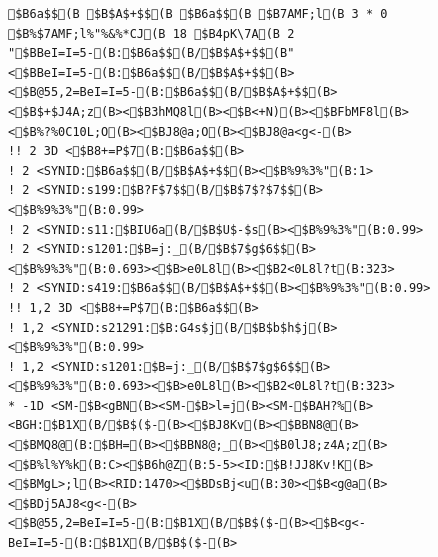 \documentclass[a4j]{jarticle}
\begin{document}
{{{{{{{{{\begin{figure}[t]
\begin{center}
\begin{minipage}{\hsize}
\begin{verbatim}
$B6a$$(B $B$A$+$$(B $B6a$$(B $B7AMF;l(B 3 * 0 $B%$7AMF;l%"%&%*CJ(B 18 $B4pK\7A(B 2 "$BBeI=I=5-(B:$B6a$$(B/$B$A$+$$(B" <$BBeI=I=5-(B:$B6a$$(B/$B$A$+$$(B><$B@55,2=BeI=I=5-(B:$B6a$$(B/$B$A$+$$(B><$B$+$J4A;z(B><$B3hMQ8l(B><$B<+N)(B><$BFbMF8l(B><$B%?%0C10L;O(B><$BJ8@a;O(B><$BJ8@a<g<-(B>
!! 2 3D <$B8+=P$7(B:$B6a$$(B>
! 2 <SYNID:$B6a$$(B/$B$A$+$$(B><$B%9%3%"(B:1>
! 2 <SYNID:s199:$B?F$7$$(B/$B$7$?$7$$(B><$B%9%3%"(B:0.99>
! 2 <SYNID:s11:$BIU6a(B/$B$U$-$s(B><$B%9%3%"(B:0.99>
! 2 <SYNID:s1201:$B=j:_(B/$B$7$g$6$$(B><$B%9%3%"(B:0.693><$B>e0L8l(B><$B2<0L8l?t(B:323>
! 2 <SYNID:s419:$B6a$$(B/$B$A$+$$(B><$B%9%3%"(B:0.99>
!! 1,2 3D <$B8+=P$7(B:$B6a$$(B>
! 1,2 <SYNID:s21291:$B:G4s$j(B/$B$b$h$j(B><$B%9%3%"(B:0.99>
! 1,2 <SYNID:s1201:$B=j:_(B/$B$7$g$6$$(B><$B%9%3%"(B:0.693><$B>e0L8l(B><$B2<0L8l?t(B:323>
* -1D <SM-$B<gBN(B><SM-$B>l=j(B><SM-$BAH?%(B><BGH:$B1X(B/$B$($-(B><$BJ8Kv(B><$BBN8@(B><$BMQ8@(B:$BH=(B><$BBN8@;_(B><$B0lJ8;z4A;z(B><$B%l%Y%k(B:C><$B6h@Z(B:5-5><ID:$B!JJ8Kv!K(B><$BMgL>;l(B><RID:1470><$BDsBj<u(B:30><$B<g@a(B><$BDj5AJ8<g<-(B><$B@55,2=BeI=I=5-(B:$B1X(B/$B$($-(B><$B<g<-BeI=I=5-(B:$B1X(B/$B$($-(B>

\end{verbatim}
\end{minipage}
\end{center}
\end{figure}}}}}}}}}}
\end{document}
